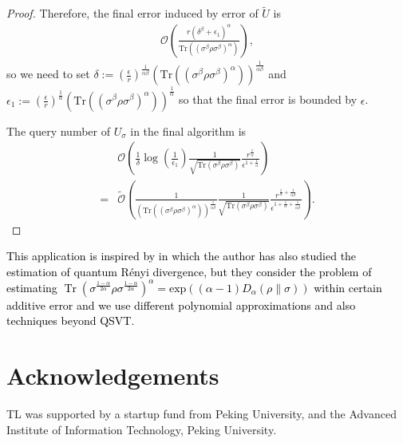 \documentclass[journal]{IEEEtran}
\begin{document}
\begin{proof}
  Therefore, the final error induced by error of $\tilde{U}$ is 
  \begin{align}
      \mathcal{O}\left(\frac{r(\delta^{\beta}+\epsilon_1)^{\alpha}}{\mathrm{Tr}((\sigma^{\beta}\rho\sigma^{\beta})^{\alpha})}\right),
  \end{align}
  so we need to set $\delta := \left(\frac{\epsilon}{r}\right)^{\frac{1}{\alpha\beta}}(\mathrm{Tr}((\sigma^{\beta}\rho\sigma^{\beta})^{\alpha}))^{\frac{1}{\alpha\beta}}$ and $\epsilon_1:=\left(\frac{\epsilon}{r}\right)^{\frac{1}{\alpha}}(\mathrm{Tr}((\sigma^{\beta}\rho\sigma^{\beta})^{\alpha}))^{\frac{1}{\alpha}}$ so that the final error is bounded by $\epsilon$. 
  
  The query number of $U_\sigma$ in the final algorithm is 
  \begin{align}
      & \mathcal{O}\left(\frac{1}{\delta}\log(\frac{1}{\epsilon_1})\frac{1}{\sqrt{\mathrm{Tr}(\sigma^{\beta}\rho\sigma^{\beta})}}\frac{r^{\frac{1}{\alpha}}}{\epsilon^{1+\frac{1}{\alpha}}}\right) \nonumber \\
      = & \widetilde{\mathcal{O}}\left(\frac{1}{(\mathrm{Tr}((\sigma^{\beta}\rho\sigma^{\beta})^{\alpha}))^{\frac{1}{\alpha\beta}}}\frac{1}{\sqrt{\mathrm{Tr}(\sigma^{\beta}\rho\sigma^{\beta})}}\frac{r^{\frac{1}{\alpha}+\frac{1}{\alpha\beta}}}{\epsilon^{1+\frac{1}{\alpha}+\frac{1}{\alpha\beta}}}\right).
  \end{align}
\end{proof}

\textcolor{black}{This application is inspired by \cite{wang2022new} in which the author has also studied the estimation of quantum R{\'e}nyi divergence, but they consider the problem of estimating $\operatorname{Tr}\left(\sigma^{\frac{1-\alpha}{2 \alpha}} \rho \sigma^{\frac{1-\alpha}{2 \alpha}}\right)^\alpha = \textrm{exp}((\alpha-1)D_{\alpha}(\rho\|\sigma))$ within certain additive error and we use different polynomial approximations and also techniques beyond QSVT. }




\section*{Acknowledgements}
TL was supported by a startup fund from Peking University, and the Advanced Institute of Information Technology, Peking University.

\end{document}
